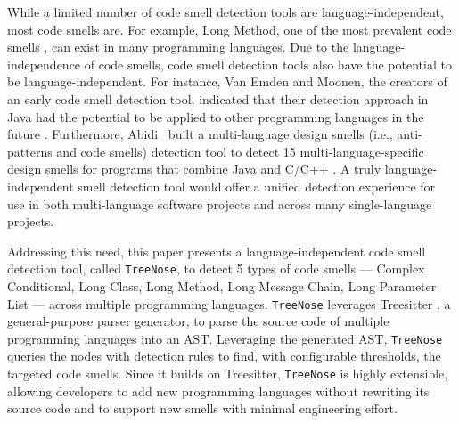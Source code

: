 
While a limited number of code smell detection tools are language-independent,
most code smells are. For example, Long Method, one of the most prevalent code
smells \cite{developersCare}, can exist in many programming languages. Due to
the language-independence of code smells, code smell detection tools also have
the potential to be language-independent. For instance, Van Emden and Moonen,
the creators of an early code smell detection tool, indicated that their
detection approach in Java had the potential to be applied to other programming
languages in the future \cite{1173068}. Furthermore, Abidi~\etal{} built a
multi-language design smells (i.e., anti-patterns and code smells) detection
tool to detect 15 multi-language-specific design smells for programs that
combine Java and C/C++ \cite{MultiLanguageCodeSmells,Fault-Prone}. A truly
language-independent smell detection tool would offer a unified detection
experience for use in both multi-language software projects and across many
single-language projects.


Addressing this need, this paper presents a language-independent code smell
detection tool, called \texttt{TreeNose}, to detect 5 types of code smells ---
Complex Conditional, Long Class, Long Method, Long Message Chain, Long Parameter
List --- across multiple programming languages. \texttt{TreeNose} leverages
Treesitter \cite{treeSitter}, a general-purpose parser generator, to parse the
source code of multiple programming languages into an AST. Leveraging the
generated AST, \texttt{TreeNose} queries the nodes with detection rules to find,
with configurable thresholds, the targeted code smells. Since it builds on
Treesitter, \texttt{TreeNose} is highly extensible, allowing developers to add
new programming languages without rewriting its source code and to support new
smells with minimal engineering effort.


